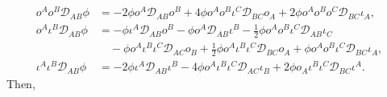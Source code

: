 \documentclass[10pt,a4paper]{article}
\theoremstyle{plain}
\begin{document}
\begin{subequations}
\begin{align}
 o^{A} o^{B} \mathcal{D}_{AB}\phi &= -2 \phi o^{A} \mathcal{D}_{AB}o^{B} + 4 \phi o^{A} o^{B} \iota^{C} \mathcal{D}_{BC}o_{A} + 2 \phi o^{A} o^{B} o^{C} \mathcal{D}_{BC}\iota_{A},\\
 o^{A} \iota^{B} \mathcal{D}_{AB}\phi &= - \phi \iota^{A} \mathcal{D}_{AB}o^{B} -  \phi  o^{A} \mathcal{D}_{AB}\iota^{B} -  \tfrac{1}{2} \phi  o^{A} o^{B} \iota^{C} \mathcal{D}_{AB}\iota_{C} \nonumber\\
&\quad-  \phi o^{A} \iota^{B} \iota^{C} \mathcal{D}_{AC}o_{B} + \tfrac{1}{2} \phi o^{A}  \iota^{B} \iota^{C} \mathcal{D}_{BC}o_{A} +  \phi o^{A} o^{B} \iota^{C} \mathcal{D}_{BC}\iota_{A},\\
 \iota^{A} \iota^{B} \mathcal{D}_{AB}\phi &= -2 \phi \iota^{A} \mathcal{D}_{AB}\iota^{B} - 4 \phi o^{A}\iota^{B} \iota^{C} \mathcal{D}_{AC}\iota_{B} + 2 \phi o_{A} \iota^{B} \iota^{C} \mathcal{D}_{BC}\iota^{A}.
\end{align}
\end{subequations}
Then, 
\end{document}
